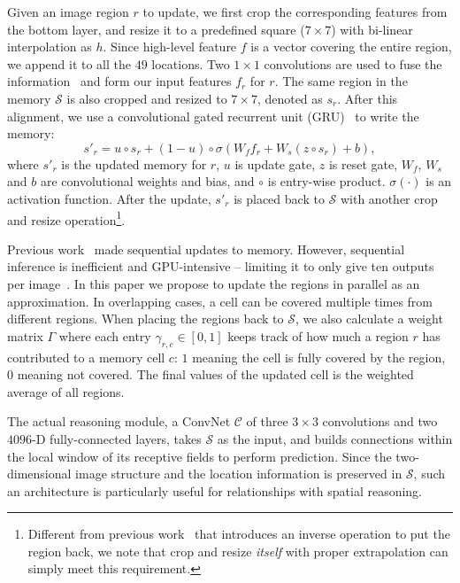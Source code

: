 \documentclass[10pt,twocolumn,letterpaper]{article}
\begin{document}
Given an image region $r$ to update, we first crop the corresponding features from the bottom layer, and resize it to a predefined square ($7{\times}7$) with bi-linear interpolation as $h$. Since high-level feature $f$ is a vector covering the entire region, we append it to all the $49$ locations. Two $1{\times}1$ convolutions are used to fuse the information~\cite{chen2017spatial} and form our input features $f_r$ for $r$. The same region in the memory $\mathcal{S}$ is also cropped and resized to $7{\times}7$, denoted as $s_r$. After this alignment, we use a convolutional gated recurrent unit (GRU)~\cite{chung2014empirical} to write the memory:
\begin{equation}\label{gru}
    s'_r = u \circ s_r + (1 - u) \circ \sigma(W_f f_r + W_s(z \circ s_r) + b),
\end{equation}
where $s'_r$ is the updated memory for $r$, $u$ is update gate, $z$ is reset gate, $W_f$, $W_s$ and $b$ are convolutional weights and bias, and $\circ$ is entry-wise product. $\sigma(\cdot)$ is an activation function. After the update, $s'_r$ is placed back to $\mathcal{S}$ with another crop and resize operation\footnote{Different from previous work~\cite{chen2017spatial} that introduces an inverse operation to put the region back, we note that crop and resize \emph{itself} with proper extrapolation can simply meet this requirement.}.

 Previous work~\cite{chen2017spatial} made sequential updates to memory. However, sequential inference is inefficient and GPU-intensive -- limiting it to only give ten outputs per image~\cite{chen2017spatial}. In this paper we propose to update the regions in parallel as an approximation. In overlapping cases, a cell can be covered multiple times from different regions. When placing the regions back to $\mathcal{S}$, we also calculate a weight matrix $\Gamma$ where each entry $\gamma_{r,c}{\in}[0,1]$ keeps track of how much a region $r$ has contributed to a memory cell $c$: $1$ meaning the cell is fully covered by the region, $0$ meaning not covered. The final values of the updated cell is the weighted average of all regions. 

The actual reasoning module, a ConvNet $\mathcal{C}$ of three $3{\times}3$ convolutions and two $4096$-D fully-connected layers, takes $\mathcal{S}$ as the input, and builds connections within the local window of its receptive fields to perform prediction. Since the two-dimensional image structure and the location information is preserved in $\mathcal{S}$, such an architecture is particularly useful for relationships with spatial reasoning.
\end{document}
